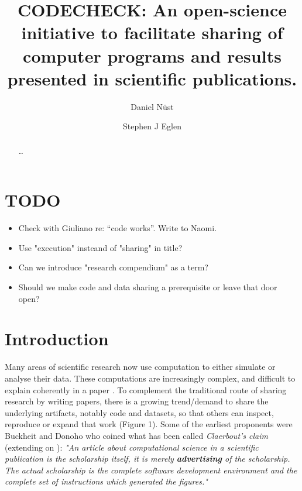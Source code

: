 \documentclass[12pt]{article}
\begin{document}
\title{CODECHECK: An open-science initiative to facilitate sharing of
  computer programs and results presented in scientific publications.}
\author[1,$\ast$]{Daniel N\"{u}st}
\author[2,$\ast$]{Stephen J Eglen}
\maketitle
\begin{abstract}
\ldots{}
\end{abstract}

\section*{TODO}\label{todo}

\begin{itemize}
\item Check with Giuliano re: ``code works''. Write to Naomi.
\item Use "execution" insteand of "sharing" in title?
\item Can we introduce "research compendium" as a term?
\item Should we make code and data sharing a prerequisite or leave that door open?
\end{itemize}

\section*{Introduction}\label{introduction}

Many areas of scientific research now use computation to either simulate
or analyse their data. These computations are increasingly complex, and
difficult to explain coherently in a paper \citep{marwick_how_2015}. To complement the
traditional route of sharing research by writing papers, there is a
growing trend/demand to share the underlying artifacts, notably code and
datasets, so that others can inspect, reproduce or expand that work
(Figure 1). Some of the earliest proponents were Buckheit and Donoho \cite{buckheit_wavelab_1995} who coined what has been called 
\emph{Claerbout's claim} (extending on \citet{claerbout_electronic_1992}):
\emph{"An article about computational science in a scientific publication 
is  the scholarship itself, it is merely \textbf{advertising} of
the scholarship. The actual scholarship is the complete software development
environment and the complete set of instructions which generated the 
figures."}
\end{document}
